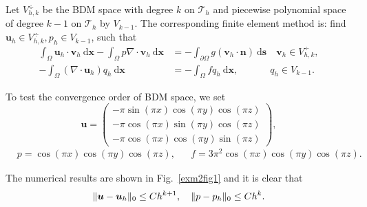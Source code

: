 \documentclass[mathpazo]{cicp}
\begin{document}
Let $V_{h,k}^{\div}$ be the BDM space with degree $k$ on $\mathcal T_h$ and
piecewise polynomial space of degree $k-1$ on $\mathcal T_h$ by $V_{k-1}$.  
The corresponding finite element method is: find 
$\boldsymbol u_h \in V_{h,k}^{\div}, p_h \in V_{k-1}$, such that
\begin{align}
  \int_{\Omega} \boldsymbol u_h \cdot \boldsymbol v_h \ \mathrm d\boldsymbol x -
  \int_{\Omega} p\nabla \cdot \boldsymbol v_h \ \mathrm d\boldsymbol x & =
  -\int_{\partial \Omega} g(\boldsymbol v_h \cdot \boldsymbol n) \
  \mathrm d\boldsymbol s \quad  \boldsymbol v_h \in V_{h,k}^{\div},\label{exm2eq1}\\
  -\int_{\Omega} (\nabla \cdot \boldsymbol u_h) q_h \ \mathrm d\boldsymbol x &=
  -\int_{\Omega} fq_h \ \mathrm d\boldsymbol x, \qquad\quad\;  q_h \in V_{k-1}.\label{exm2eq2}
\end{align}



To test the convergence order of BDM space, we set
$$
\boldsymbol u = 
\begin{pmatrix}
-\pi\sin(\pi x)\cos(\pi y)\cos(\pi z)\\ 
-\pi\cos(\pi x)\sin(\pi y)\cos(\pi z)\\
-\pi\cos(\pi x)\cos(\pi y)\sin(\pi z)
\end{pmatrix},
$$
\begin{align*}
& p = \cos(\pi x)\cos(\pi y)\cos(\pi z), &  & f = 3\pi^2\cos(\pi x)\cos(\pi y)\cos(\pi z).&
\end{align*}

The numerical results are shown in Fig.~\ref{exm2fig1} and it is clear that 
$$
\|\boldsymbol u-\boldsymbol u_h\|_{0} \leq C h^{k+1}, \quad \|p - p_h\|_{0} \leq Ch^{k}.
$$
\end{document}
